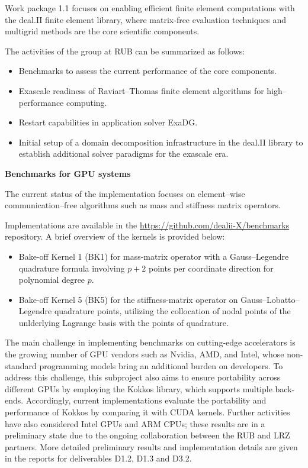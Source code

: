 \documentclass[a4paper,12pt, numbers]{article}
\begin{document}
Work package 1.1 focuses on enabling efficient finite element computations
with the deal.II finite element library, where matrix-free evaluation
techniques and multigrid methods are the core scientific components.

The activities of the group at RUB can be summarized as follows:
\begin{itemize}
	\item Benchmarks to assess the current performance of the core components.
	\item Exascale readiness of Raviart--Thomas finite element algorithms for high--performance computing.
	\item Restart capabilities in application solver ExaDG.
	\item Initial setup of a domain decomposition infrastructure in the deal.II library to establish additional solver paradigms for the exascale era.
\end{itemize}



\noindent\textbf{Benchmarks for GPU systems}

The current status of the implementation focuses on element--wise communication--free algorithms such as mass and stiffness matrix operators. 

Implementations are available in the \url{https://github.com/dealii-X/benchmarks} repository. A brief overview of the kernels is provided below:
\begin{itemize}
	\item Bake-off Kernel 1 (BK1) for mass-matrix operator with a Gauss--Legendre quadrature formula involving $p+2$ points per coordinate direction for polynomial degree $p$.
	\item Bake-off Kernel 5 (BK5) for the stiffness-matrix operator on Gauss--Lobatto--Legendre quadrature points, utilizing the collocation of nodal points of the unlderlying Lagrange basis with the points of quadrature.
\end{itemize}

The main challenge in implementing benchmarks on cutting-edge accelerators is the growing number of GPU vendors such as Nvidia, AMD, and Intel, whose non-standard programming models bring an additional burden on developers. To address this challenge, this subproject also aims to ensure portability across different GPUs by employing the Kokkos library, which supports multiple back-ends. Accordingly, current implementations evaluate the portability and performance of Kokkos by comparing it with CUDA kernels.
Further activities have also considered Intel GPUs and ARM CPUs; these results are in a preliminary state due to the ongoing collaboration between the RUB
and LRZ partners. More detailed preliminary results and implementation details are given in the reports for deliverables D1.2, D1.3 and D3.2.
\end{document}
